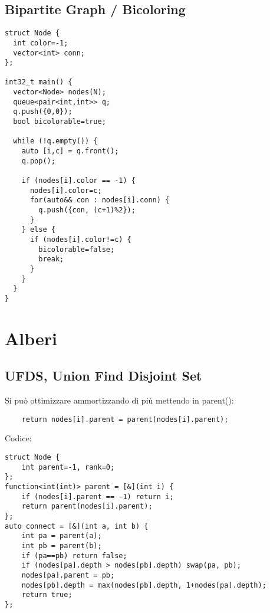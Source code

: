 \documentclass{article}
\begin{document}
\subsection{Bipartite Graph / Bicoloring}
\begin{lstlisting}
struct Node {
  int color=-1;
  vector<int> conn;
};

int32_t main() {
  vector<Node> nodes(N);
  queue<pair<int,int>> q;
  q.push({0,0});
  bool bicolorable=true;

  while (!q.empty()) {
    auto [i,c] = q.front();
    q.pop();

    if (nodes[i].color == -1) {
      nodes[i].color=c;
      for(auto&& con : nodes[i].conn) {
        q.push({con, (c+1)%2});
      }
    } else {
      if (nodes[i].color!=c) {
        bicolorable=false;
        break;
      }
    }
  }
}
\end{lstlisting}

\section{Alberi}

\subsection{UFDS, Union Find Disjoint Set}
Si può ottimizzare ammortizzando di più mettendo in parent():
\begin{lstlisting}
    return nodes[i].parent = parent(nodes[i].parent);
\end{lstlisting}
Codice:
\begin{lstlisting}
struct Node {
    int parent=-1, rank=0;
};
function<int(int)> parent = [&](int i) {
    if (nodes[i].parent == -1) return i;
    return parent(nodes[i].parent);
};
auto connect = [&](int a, int b) {
    int pa = parent(a);
    int pb = parent(b);
    if (pa==pb) return false;
    if (nodes[pa].depth > nodes[pb].depth) swap(pa, pb);
    nodes[pa].parent = pb;
    nodes[pb].depth = max(nodes[pb].depth, 1+nodes[pa].depth);
    return true;
};
\end{lstlisting}
\end{document}
